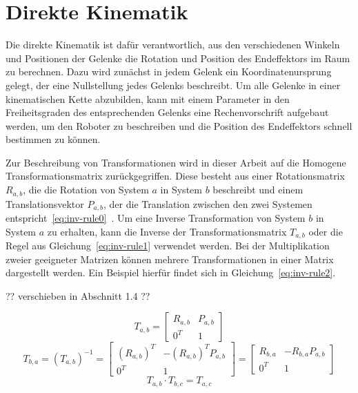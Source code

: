 \cleardoublepage


\chapter{Direkte Kinematik}\label{ch:direkte-kinematik}

Die direkte Kinematik ist dafür verantwortlich, aus den verschiedenen Winkeln und Positionen der Gelenke die Rotation und Position des Endeffektors im Raum zu berechnen.
Dazu wird zunächst in jedem Gelenk ein Koordinatenursprung gelegt, der eine Nullstellung jedes Gelenks beschreibt.
Um alle Gelenke in einer kinematischen Kette abzubilden, kann mit einem Parameter in den Freiheitsgraden des entsprechenden Gelenks eine Rechenvorschrift aufgebaut werden, um den Roboter zu beschreiben und die Position des Endeffektors schnell bestimmen zu können.

Zur Beschreibung von Transformationen wird in dieser Arbeit auf die Homogene Transformationsmatrix zurückgegriffen.
Diese besteht aus einer Rotationsmatrix $R_{a,b}$, die die Rotation von System $a$ in System $b$ beschreibt und einem Translationsvektor $P_{a,b}$, der die Translation zwischen den zwei Systemen entspricht~\ref{eq:inv-rule0}~\cite[28]{craigIntroductionRoboticsMechanics2009}.
Um eine Inverse Transformation von System $b$ in System $a$ zu erhalten, kann die Inverse der Transformationsmatrix $T_{a,b}$ oder die Regel aus Gleichung~\ref{eq:inv-rule1} verwendet werden.
Bei der Multiplikation zweier geeigneter Matrizen können mehrere Transformationen in einer Matrix dargestellt werden.
Ein Beispiel hierfür findet sich in Gleichung~\ref{eq:inv-rule2}.

?? verschieben in Abschnitt 1.4 ??

\begin{equation}
    T_{a,b} = \begin{bmatrix}
                  R_{a,b} & P_{a,b} \\
                  0^T     & 1
    \end{bmatrix} \label{eq:inv-rule0}
\end{equation}
\begin{equation}
    T_{b,a} = \left( T_{a,b} \right)^{-1} =
    \begin{bmatrix}
        \left(R_{a,b}\right)^T & - \left(R_{a,b}\right)^T P_{a,b} \\
        0^T     & 1
    \end{bmatrix} =
    \begin{bmatrix}
        R_{b,a} & - R_{b,a}P_{a,b} \\
        0^T     & 1
    \end{bmatrix}
    \label{eq:inv-rule1}
\end{equation}
\begin{equation}
    T_{a,b}\cdot T_{b,c}=T_{a,c}    \label{eq:inv-rule2}
\end{equation}


